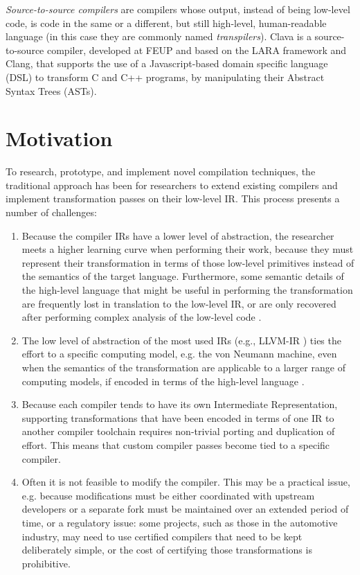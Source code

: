 \textit{Source-to-source compilers} are compilers whose output, instead of being low-level code, is code in the same or a different, but still high-level, human-readable language (in this case they are commonly named \textit{transpilers}). Clava is a source-to-source compiler, developed at FEUP and based on the LARA framework and Clang, that supports the use of a Javascript-based domain specific language (DSL) to transform C and C++ programs, by manipulating their Abstract Syntax Trees (ASTs).

\section{Motivation} \label{sec:motivation}

To research, prototype, and implement novel compilation techniques, the traditional approach has been for researchers to extend existing compilers and implement transformation passes on their low-level IR. This process presents a number of challenges:

\begin{enumerate}
    \item Because the compiler IRs have a lower level of abstraction, the researcher meets a higher learning curve when performing their work, because they must represent their transformation in terms of those low-level primitives instead of the semantics of the target language. Furthermore, some semantic details of the high-level language that might be useful in performing the transformation are frequently lost in translation to the low-level IR, or are only recovered after performing complex analysis of the low-level code \cite{Zangerl2018}.
    \item The low level of abstraction of the most used IRs (e.g., LLVM-IR \cite{Lattner2004}) ties the effort to a specific computing model, e.g. the von Neumann machine, even when the semantics of the transformation are applicable to a larger range of computing models, if encoded in terms of the high-level language \cite{Lattner2021}.
    \item Because each compiler tends to have its own Intermediate Representation, supporting transformations that have been encoded in terms of one IR to another compiler toolchain requires non-trivial porting and duplication of effort. This means that custom compiler passes become tied to a specific compiler.
    \item Often it is not feasible to modify the compiler. This may be a practical issue, e.g. because modifications must be either coordinated with upstream developers or a separate fork must be maintained over an extended period of time, or a regulatory issue: some projects, such as those in the automotive industry, may need to use certified compilers that need to be kept deliberately simple, or the cost of certifying those transformations is prohibitive.
\end{enumerate}

